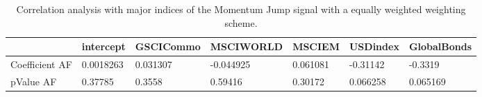 \begin{table}[H]
\centering
\begin{tabular}{lllllll}
\hline& intercept & GSCICommo & MSCIWORLD & MSCIEM & USDindex & GlobalBonds \\ 
\hline 
Coefficient AF & 0.0018263 & 0.031307 & -0.044925 & 0.061081 & -0.31142 & -0.3319 \\ 
pValue AF & 0.37785 & 0.3558 & 0.59416 & 0.30172 & 0.066258 & 0.065169 \\ 
\hline
\end{tabular}
\caption{Correlation analysis with major indices of the Momentum Jump signal with a equally weighted weighting scheme.}
\label{MOMJUMPEW_AFACTOR}
\end{table}